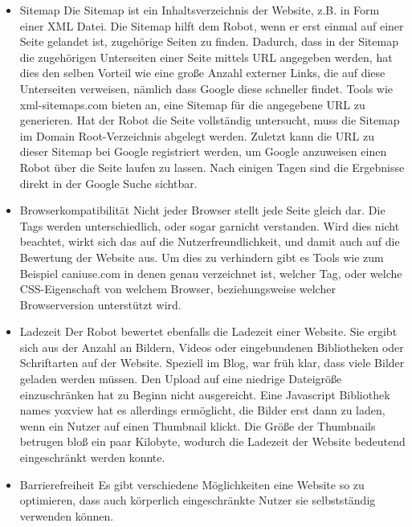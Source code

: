 \begin{itemize}
      \item Sitemap
      	Die Sitemap ist ein Inhaltsverzeichnis der Website, z.B. in Form einer XML Datei. Die Sitemap hilft dem Robot, wenn er erst einmal auf einer Seite gelandet ist, zugehörige Seiten
        zu finden. Dadurch, dass in der Sitemap die zugehörigen Unterseiten einer Seite mittels URL angegeben werden, hat dies den selben Vorteil wie eine große Anzahl externer Links, die auf diese
        Unterseiten verweisen, nämlich dass Google diese schneller findet. Tools wie xml-sitemaps.com bieten an, eine Sitemap für die angegebene URL zu generieren. Hat der Robot die Seite vollständig
        untersucht, muss die Sitemap im Domain Root-Verzeichnis abgelegt werden. Zuletzt kann die URL zu dieser Sitemap bei Google registriert werden, um Google anzuweisen einen Robot über die Seite
        laufen zu lassen. Nach einigen Tagen sind die Ergebnisse direkt in der Google Suche sichtbar.

      \item Browserkompatibilität
        Nicht jeder Browser stellt jede Seite gleich dar. Die Tags werden unterschiedlich, oder sogar garnicht verstanden. Wird dies nicht beachtet, wirkt sich das auf die Nutzerfreundlichkeit,
        und damit auch auf die Bewertung der Website aus. Um dies zu verhindern gibt es Tools wie zum Beispiel caniuse.com in denen genau verzeichnet ist, welcher Tag, oder welche CSS-Eigenschaft
        von welchem Browser, beziehungsweise welcher Browserversion unterstützt wird.

      \item Ladezeit
        Der Robot bewertet ebenfalls die Ladezeit einer Website. Sie ergibt sich aus der Anzahl an Bildern, Videos oder eingebundenen Bibliotheken oder Schriftarten auf der Website.
        Speziell im Blog, war früh klar, dass viele Bilder geladen werden müssen. Den Upload auf eine niedrige Dateigröße einzuschränken hat zu Beginn nicht ausgereicht.
        Eine Javascript Bibliothek names yoxview hat es allerdings ermöglicht, die Bilder erst dann zu laden, wenn ein Nutzer auf einen Thumbnail klickt. Die Größe der Thumbnails betrugen bloß
        ein paar Kilobyte, wodurch die Ladezeit der Website bedeutend eingeschränkt werden konnte.

      \item Barrierefreiheit
        Es gibt verschiedene Möglichkeiten eine Website so zu optimieren, dass auch körperlich eingeschränkte Nutzer sie selbstständig verwenden können.


    \end{itemize}

